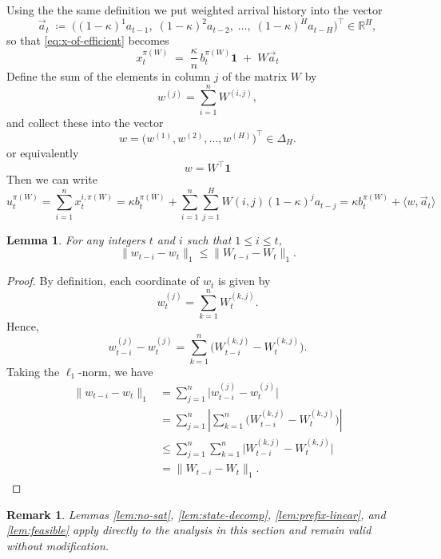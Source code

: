 \documentclass[11pt]{article}
\newtheorem{Thm:Lemma}{Lemma}
\newtheorem{Thm:Remark}{Remark}
\begin{document}
Using the the same definition we put  weighted arrival history into the vector
\[
\vec{a}_t
\;\coloneqq\;
\bigl((1-\kappa)^1 a_{t-1},\; (1-\kappa)^2 a_{t-2},\;\dots,\; (1-\kappa)^H a_{t-H}\bigr)^\top
\in \mathbb{R}^H ,
\]
so that \eqref{eq:x-of-efficient} becomes
\begin{equation}
    \label{eq:x-vec-1}
    x_t^{\pi(W)} \;=\; \frac{\kappa}{n}\, b_t^{\pi(W)} \mathbf{1} \;+\; W \vec{a}_t
\end{equation}
Define the sum of the elements in column \(j\) of the matrix \(W\) by
\[
w^{(j)}
=
\sum_{i=1}^n W^{(i,j)},
\]
and collect these into the vector
\[
w = \big( w^{(1)}, w^{(2)}, \ldots, w^{(H)} \big)^\top \in \Delta_H.
\]
or equivalently
\[
w = 
W^\top \mathbf{1}
\]
Then we can write 
\[
u_t^{\pi(W)}
=
\sum_{i=1}^n x_t^{i,\pi(W)}
=
\kappa b_t^{\pi(W)}
+
\sum_{i=1}^n \sum_{j=1}^H  W(i,j) (1-\kappa)^j a_{t-j}
=
\kappa b_t^{\pi(W)}
+
\langle w,\vec{a}_t\rangle
\]





\begin{Thm:Lemma}\label{lem:w-l1-W}
For any integers \( t \) and \( i \) such that \( 1 \leq i \leq t \),
\[
\|w_{t-i} - w_t\|_1 \leq \|W_{t-i} - W_t\|_1.
\]
\end{Thm:Lemma}

\begin{proof}
By definition, each coordinate of \(w_t\) is given by
\[
w_t^{(j)} = \sum_{k=1}^n W_t^{(k,j)}.
\]
Hence,
\[
w_{t-i}^{(j)} - w_t^{(j)} = \sum_{k=1}^n \big( W_{t-i}^{(k,j)} - W_t^{(k,j)} \big).
\]
Taking the \(\ell_1\)-norm, we have
\begin{align*}
\|w_{t-i}-w_t\|_1
&= \sum_{j=1}^n \big| w_{t-i}^{(j)} - w_t^{(j)} \big| \\
&= \sum_{j=1}^n \left| \sum_{k=1}^n \big( W_{t-i}^{(k,j)} - W_t^{(k,j)} \big) \right| \\
&\leq \sum_{j=1}^n \sum_{k=1}^n \big| W_{t-i}^{(k,j)} - W_t^{(k,j)} \big| \\
&= \|W_{t-i} - W_t\|_1.
\end{align*}
\end{proof}



\begin{Thm:Remark}\label{rem:4-lem}
Lemmas \ref{lem:no-sat}, \ref{lem:state-decomp}, \ref{lem:prefix-linear}, and \ref{lem:feasible} apply directly to the analysis in this section and remain valid without modification.
\end{Thm:Remark}
\end{document}
